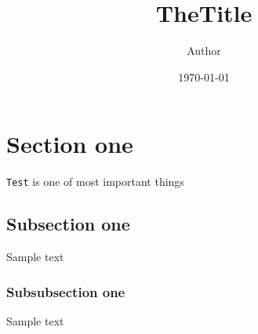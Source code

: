 \documentclass[12pt,a4paper]{article}
\title{TheTitle}
\author{Author}
\date{\today}
\newcommand{\code}[1]{\colorbox{backcolour}{\normalsize\texttt{#1}}}
\begin{document}
\maketitle

\section{Section one}
\code{Test} is one of most important things

\subsection{Subsection one}
Sample text

\subsubsection{Subsubsection one}
Sample text
\end{document}
